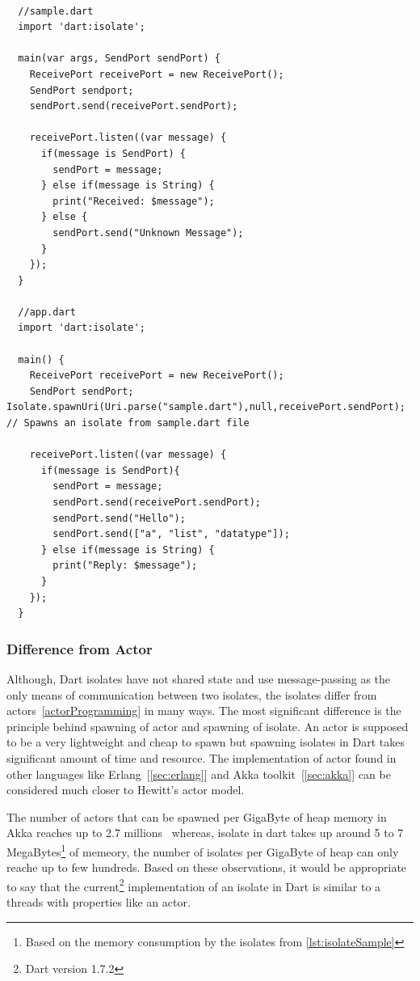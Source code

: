 \begin{lstlisting}[caption=A simple example of isolate communication in dart, label=lst:isolateSample]

  //sample.dart
  import 'dart:isolate';

  main(var args, SendPort sendPort) {
    ReceivePort receivePort = new ReceivePort();
    SendPort sendport;
    sendPort.send(receivePort.sendPort);

    receivePort.listen((var message) {
      if(message is SendPort) {
        sendPort = message;
      } else if(message is String) {
        print("Received: $message");
      } else {
        sendPort.send("Unknown Message");
      }
    });
  }

  //app.dart
  import 'dart:isolate';

  main() {
    ReceivePort receivePort = new ReceivePort();
    SendPort sendPort;  Isolate.spawnUri(Uri.parse("sample.dart"),null,receivePort.sendPort); // Spawns an isolate from sample.dart file

    receivePort.listen((var message) {
      if(message is SendPort){
        sendPort = message;
        sendPort.send(receivePort.sendPort);
        sendPort.send("Hello");
        sendPort.send(["a", "list", "datatype"]);
      } else if(message is String) {
        print("Reply: $message");
      }
    });
  }
\end{lstlisting}

  \subsubsection{Difference from Actor}
  Although, Dart isolates have not shared state and use message-passing as the only means of communication between two isolates, the isolates differ from actors~\autoref{actorProgramming} in many ways. The most significant difference is the principle behind spawning of actor and spawning of isolate. An actor is supposed to be a very lightweight and cheap to spawn but spawning isolates in Dart takes significant amount of time and resource. The implementation of actor found in other languages like Erlang~[\autoref{sec:erlang}] and Akka toolkit~[\autoref{sec:akka}] can be considered much closer to Hewitt's actor model.

  The number of actors that can be spawned per GigaByte of heap memory in Akka reaches up to 2.7 millions~\cite{akkaHome} whereas, isolate in dart takes up around 5 to 7 MegaBytes\footnote{Based on the memory consumption by the isolates from \autoref{lst:isolateSample}} of memeory, the number of isolates per GigaByte of heap can only reache up to few hundreds. Based on these observations, it would be appropriate to say that the current\footnote{Dart version 1.7.2} implementation of an isolate in Dart is \textemdash{} similar to a threads with properties like an actor.

